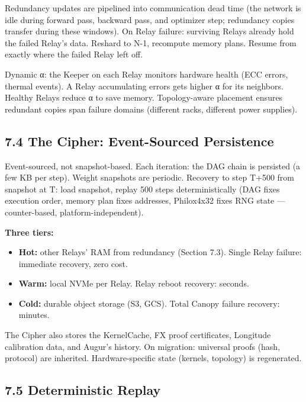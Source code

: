 Redundancy updates are pipelined into communication dead time (the network is idle during forward pass, backward pass, and optimizer step; redundancy copies transfer during these windows). On Relay failure: surviving Relays already hold the failed Relay's data. Reshard to N-1, recompute memory plans. Resume from exactly where the failed Relay left off.

Dynamic α: the Keeper on each Relay monitors hardware health (ECC errors, thermal events). A Relay accumulating errors gets higher α for its neighbors. Healthy Relays reduce α to save memory. Topology-aware placement ensures redundant copies span failure domains (different racks, different power supplies).

\subsection{7.4 The Cipher: Event-Sourced Persistence}\label{the-cipher-event-sourced-persistence}

Event-sourced, not snapshot-based. Each iteration: the DAG chain is persisted (a few KB per step). Weight snapshots are periodic. Recovery to step T+500 from snapshot at T: load snapshot, replay 500 steps deterministically (DAG fixes execution order, memory plan fixes addresses, Philox4x32 fixes RNG state --- counter-based, platform-independent).

\textbf{Three tiers:}

\begin{itemize}
\tightlist
\item
  \textbf{Hot:} other Relays' RAM from redundancy (Section 7.3). Single Relay failure: immediate recovery, zero cost.
\item
  \textbf{Warm:} local NVMe per Relay. Relay reboot recovery: seconds.
\item
  \textbf{Cold:} durable object storage (S3, GCS). Total Canopy failure recovery: minutes.
\end{itemize}

The Cipher also stores the KernelCache, FX proof certificates, Longitude calibration data, and Augur's history. On migration: universal proofs (hash, protocol) are inherited. Hardware-specific state (kernels, topology) is regenerated.

\subsection{7.5 Deterministic Replay}\label{deterministic-replay}

